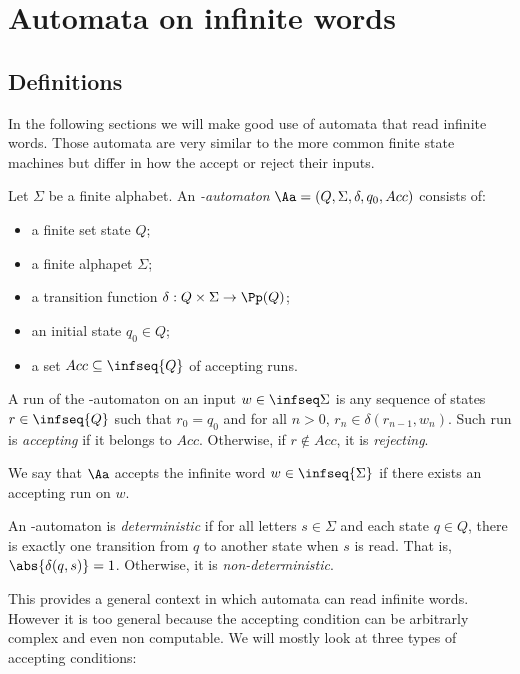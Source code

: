 \section{Automata on infinite words}
\subsection{Definitions}

In the following sections
we will make good use of automata that read infinite words.
Those automata are very similar to the more common
finite state machines but differ in how the accept
or reject their inputs.

\begin{definition}
    Let $\Sigma$ be a finite alphabet.
    An \emph{\w-automaton} $\Aa = (Q, \Sigma, \delta, q_0, Acc)$
    consists of:
    \begin{itemize}
        \item a finite set state $Q$;
        \item a finite alphapet $\Sigma$;
        \item a transition function $\delta : Q \times \Sigma \to \Pp(Q)$;
        \item an initial state $q_0 \in Q$;
        \item a set $Acc \subseteq \infseq{Q}$ of accepting runs.
    \end{itemize}

    A run of the \w-automaton on an input $w \in \infseq\Sigma$
    is any sequence of states $r \in \infseq{Q}$ such that
    $r_0 = q_0$ and for all $n > 0$, $r_n \in \delta(r_{n-1}, w_n)$.
    Such run is \emph{accepting} if it belongs to $Acc$.
    Otherwise, if $r \notin Acc$, it is \emph{rejecting}.

    We say that $\Aa$ accepts the infinite word $w \in \infseq{\Sigma}$
    if there exists an accepting run on $w$.

    An \w-automaton is \emph{deterministic} if for all
    letters $s \in \Sigma$ and each state $q \in Q$,
    there is exactly one transition from $q$ to another state
    when $s$ is read. That is, $\abs{\delta(q, s)} = 1$.
    Otherwise, it is \emph{non-deterministic}.

\end{definition}

This provides a general context in which automata can read infinite
words. However it is too general because the accepting condition
can be arbitrarly complex and even non computable.
We will mostly look at three types of accepting conditions:


